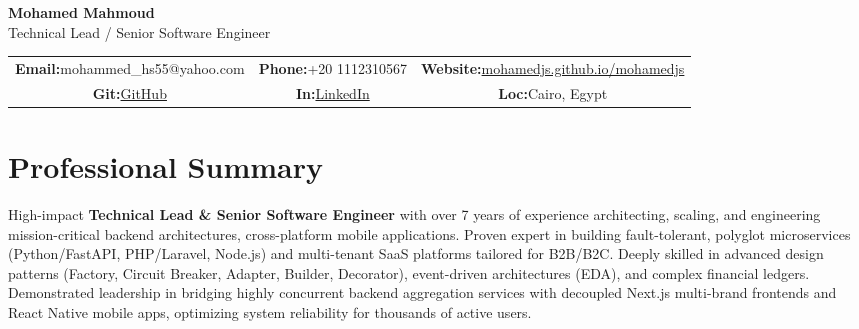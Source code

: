 \documentclass[11pt, a4paper]{article}
\newcommand{\contactitem}[2]{#1\hspace{0.5ex}#2}
\begin{document}
\pagestyle{empty}

\begin{center}
    {\Huge\bfseries\color{primary}Mohamed Mahmoud} \\[0.5ex]
    {\Large\color{secondary}Technical Lead / Senior Software Engineer} \\[1ex]
    \begin{tabular}{@{}c@{\quad}c@{\quad}c@{}}
        \contactitem{\textbf{Email:}}{mohammed\_hs55@yahoo.com} &
        \contactitem{\textbf{Phone:}}{+20 1112310567} &
        \contactitem{\textbf{Website:}}{\href{https://mohamedjs.github.io/mohamedjs/}{mohamedjs.github.io/mohamedjs}} \\[0.5ex]
        \contactitem{\textbf{Git:}}{\href{https://github.com/mohamedis}{GitHub}} &
        \contactitem{\textbf{In:}}{\href{https://www.linkedin.com/in/mohamed-mahmoud-19ab47122}{LinkedIn}} &
        \contactitem{\textbf{Loc:}}{Cairo, Egypt}
    \end{tabular}
\end{center}

\section*{Professional Summary}
High-impact \textbf{Technical Lead \& Senior Software Engineer} with over 7 years of experience architecting, scaling, and engineering mission-critical backend architectures, cross-platform mobile applications. Proven expert in building fault-tolerant, polyglot microservices (Python/FastAPI, PHP/Laravel, Node.js) and multi-tenant SaaS platforms tailored for B2B/B2C. Deeply skilled in advanced design patterns (Factory, Circuit Breaker, Adapter, Builder, Decorator), event-driven architectures (EDA), and complex financial ledgers. Demonstrated leadership in bridging highly concurrent backend aggregation services with decoupled Next.js multi-brand frontends and React Native mobile apps, optimizing system reliability for thousands of active users.
\end{document}
